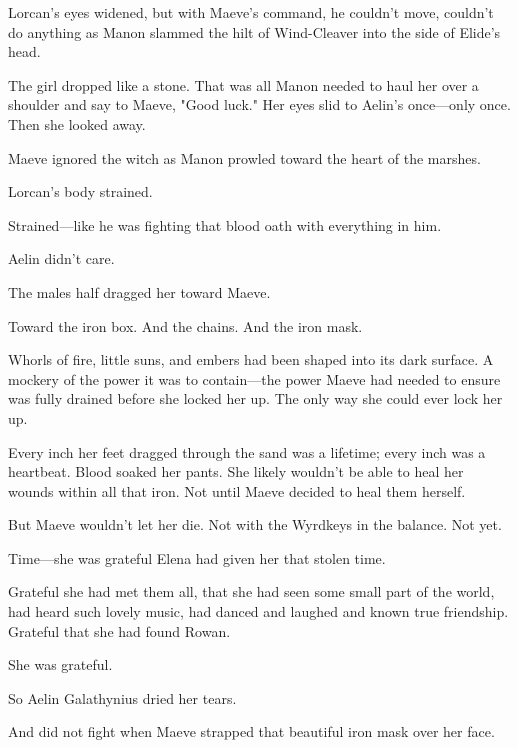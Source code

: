 Lorcan's eyes widened, but with Maeve's command, he couldn't move, couldn't do anything as Manon slammed the hilt of Wind-Cleaver into the side of Elide's head.

The girl dropped like a stone. That was all Manon needed to haul her over a shoulder and say to Maeve, "Good luck." Her eyes slid to Aelin's once---only once. Then she looked away.

Maeve ignored the witch as Manon prowled toward the heart of the marshes.

Lorcan's body strained.

Strained---like he was fighting that blood oath with everything in him.

Aelin didn't care.

The males half dragged her toward Maeve.

Toward the iron box. And the chains. And the iron mask.

Whorls of fire, little suns, and embers had been shaped into its dark surface. A mockery of the power it was to contain---the power Maeve had needed to ensure was fully drained before she locked her up. The only way she could ever lock her up.

Every inch her feet dragged through the sand was a lifetime; every inch was a heartbeat. Blood soaked her pants. She likely wouldn't be able to heal her wounds within all that iron. Not until Maeve decided to heal them herself.

But Maeve wouldn't let her die. Not with the Wyrdkeys in the balance. Not yet.

Time---she was grateful Elena had given her that stolen time.

Grateful she had met them all, that she had seen some small part of the world, had heard such lovely music, had danced and laughed and known true friendship. Grateful that she had found Rowan.

She was grateful.

So Aelin Galathynius dried her tears.

And did not fight when Maeve strapped that beautiful iron mask over her face.
